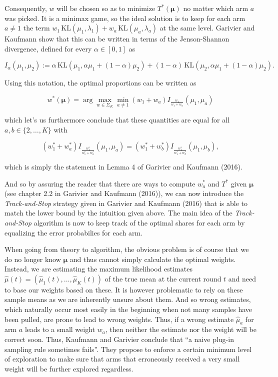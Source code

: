 \documentclass[11pt,]{article}
\newcommand{\KL}{\,\text{KL}}
\begin{document}
Consequently, \(w\) will be chosen so as to minimize \(T^*(\bm{\mu})\)
no matter which arm \(a\) was picked. It is a minimax game, so the ideal
solution is to keep for each arm \(a \neq 1\) the term
\(w_1 \KL(\mu_1, \lambda_1) + w_a \KL(\mu_a, \lambda_a)\) at the same
level. Garivier and Kaufmann show that this can be written in terms of
the Jenson-Shannon divergence, defined for every \(\alpha \in [0,1]\) as

\begin{equation*}
I_{\alpha}(\mu_1, \mu_2) := \alpha \KL(\mu_1, \alpha \mu_1 + (1-\alpha) \mu_2) + (1-\alpha) \KL(\mu_2, \alpha \mu_1 + (1-\alpha) \mu_2).
\end{equation*}

Using this notation, the optimal proportions can be written as

\begin{equation*}
w^*(\bm{\mu}) = \arg \max_{w \in \Sigma_K} \min_{a \neq 1} (w_1 + w_a) I_{\frac{w_1}{w_1+w_a}}(\mu_1, \mu_a)
\end{equation*}

which let's us furthermore conclude that these quantities are equal for
all \(a,b \in \{2,\dots, K\}\) with

\begin{equation*}
(w_1^* + w_a^*) I_{\frac{w_1^*}{w_1^*+w_a^*}}(\mu_1, \mu_a) = (w_1^* + w_b^*) I_{\frac{w_1^*}{w_1^*+w_b^*}}(\mu_1, \mu_b),
\end{equation*}

which is simply the statement in Lemma 4 of Garivier and Kaufmann
(2016).

And so by assuring the reader that there are ways to compute \(w_a^*\)
and \(T^*\) given \(\bm{\mu}\) (see chapter 2.2 in Garivier and Kaufmann
(2016)), we can now introduce the \emph{Track-and-Stop} strategy given
in Garivier and Kaufmann (2016) that is able to match the lower bound by
the intuition given above. The main idea of the \emph{Track-and-Stop}
algorithm is now to keep track of the optimal shares for each arm by
equalizing the error probabilies for each arm.

When going from theory to algorithm, the obvious problem is of course
that we do no longer know \(\bm{\mu}\) and thus cannot simply calculate
the optimal weights. Instead, we are estimating the maximum likelihood
estimates \(\hat{\mu}(t) = (\hat{\mu}_1(t), \dots, \hat{\mu}_K(t))\) of
the true mean at the current round \(t\) and need to base our weights
based on these. It is however problematic to rely on these sample means
as we are inherently unsure about them. And so wrong estimates, which
naturally occur most easily in the beginning when not many samples have
been pulled, are prone to lead to wrong weights. Thus, if a wrong
estimate \(\hat{\mu}_a\) for arm \(a\) leads to a small weight \(w_a\),
then neither the estimate nor the weight will be correct soon. Thus,
Kaufmann and Garivier conclude that ``a naive plug-in sampling rule
sometimes fails''. They propose to enforce a certain minimum level of
exploration to make sure that arms that erroneously received a very
small weight will be further explored regardless.
\end{document}
